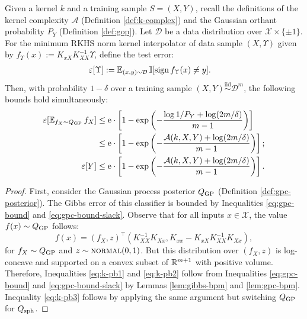 \begin{refsection}
\begin{theorem}\label{thm:k-bpm} Given a kernel $k$ and a training sample $S=(X,Y)$, recall the definitions of the kernel complexity $\mathcal{A}$ (Definition \ref{def:k-complex}) and the Gaussian orthant probability $P_Y$ (Definition \ref{def:gop}). Let $\mathcal{D}$ be a data distribution over $\mathcal{X}\times\{\pm 1\}$. For the minimum RKHS norm kernel interpolator of data sample $(X,\Upsilon)$ given by $f_{\Upsilon}(x) := K_{xX} K_{XX}^{-1} \Upsilon$, define the test error:
\begin{align*}
    \varepsilon[\Upsilon] &:= \operatorname{\mathbb{E}}_{(x,y)\sim\mathcal{D}} \mathbb{I}[\operatorname{sign} f_{\Upsilon}(x) \neq y].
\end{align*}
Then, with probability $1-\delta$ over a training sample $(X,Y) \overset{\text{iid}}{\sim}\mathcal{D}^m$, the following bounds hold simultaneously:
\begin{align}
\varepsilon[\operatorname{\mathbb{E}}_{f_X\sim Q_\mathrm{GP}}f_X] &\leq \mathrm{e} \cdot\left[ 1 - \exp \left(-\frac{\log 1/P_Y + \log (2m/\delta)}{m-1}\right)\right]\label{eq:k-pb1}\\
& \leq \mathrm{e} \cdot\left[ 1 - \exp \left(-\frac{\mathcal{A}(k,X,Y) + \log (2m/\delta)}{m-1}\right)\right];\label{eq:k-pb2}\\
\varepsilon[Y] &\leq \mathrm{e} \cdot\left[ 1 - \exp \left(-\frac{\mathcal{A}(k,X,Y) + \log (2m/\delta)}{m-1}\right)\right].\label{eq:k-pb3}
\end{align}
\end{theorem}
\begin{proof} First, consider the Gaussian process posterior $Q_\mathrm{GP}$ (Definition \ref{def:gpc-posterior}). The Gibbs error of this classifier is bounded by Inequalities \ref{eq:gpc-bound} and \ref{eq:gpc-bound-slack}. Observe that for all inputs $x\in\mathcal{X}$, the value $f(x)\sim Q_\mathrm{GP}$ follows:
\begin{equation*}
    f(x) = (f_X, z)^\top (K_{XX}^{-1} K_{Xx}, K_{xx}-K_{xX}K_{XX}^{-1}K_{Xx}),
\end{equation*}
for $f_X\sim Q_\mathrm{GP}$ and $z\sim\textsc{normal}(0,1)$. But this distribution over $(f_X,z)$ is log-concave and supported on a convex subset of $\mathbb{R}^{m+1}$ with positive volume. Therefore, Inequalities \ref{eq:k-pb1} and \ref{eq:k-pb2} follow from Inequalities \ref{eq:gpc-bound} and \ref{eq:gpc-bound-slack} by Lemmas \ref{lem:gibbs-bpm} and \ref{lem:gpc-bpm}. Inequality \ref{eq:k-pb3} follows by applying the same argument but switching $Q_\mathrm{GP}$ for $Q_\mathrm{sph}$.
\end{proof}


\end{refsection}
